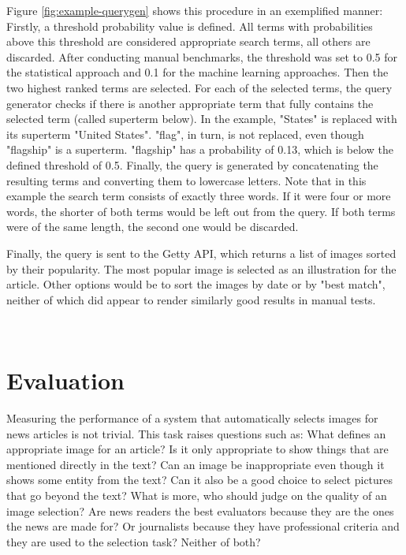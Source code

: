 \documentclass[11pt,a4paper,twoside]{article}
\begin{document}
Figure \ref{fig:example-querygen} shows this procedure in an exemplified manner: Firstly, a threshold probability value is defined. All terms with probabilities above this threshold are considered appropriate search terms, all others are discarded. After conducting manual benchmarks, the threshold was set to 0.5 for the statistical approach and 0.1 for the machine learning approaches. Then the two highest ranked terms are selected. For each of the selected terms, the query generator checks if there is another appropriate term that fully contains the selected term (called superterm below). In the example, "States" is replaced with its superterm "United States". "flag", in turn, is not replaced, even though "flagship" is a superterm. "flagship" has a probability of 0.13, which is below the defined threshold of 0.5. Finally, the query is generated by concatenating the resulting terms and converting them to lowercase letters. Note that in this example the search term consists of exactly three words. If it were four or more words, the shorter of both terms would be left out from the query. If both terms were of the same length, the second one would be discarded.

Finally, the query is sent to the Getty API, which returns a list of images sorted by their popularity. The most popular image is selected as an illustration for the article. Other options would be to sort the images by date or by "best match", neither of which did appear to render similarly good results in manual tests.

\


\cleardoublepage

\section{Evaluation} \label{Eval}

Measuring the performance of a system that automatically selects images for news articles is not trivial. This task raises questions such as: What defines an appropriate image for an article? Is it only appropriate to show things that are mentioned directly in the text? Can an image be inappropriate even though it shows some entity from the text? Can it also be a good choice to select pictures that go beyond the text? What is more, who should judge on the quality of an image selection? Are news readers the best evaluators because they are the ones the news are made for? Or journalists because they have professional criteria and they are used to the selection task? Neither of both?
\end{document}
